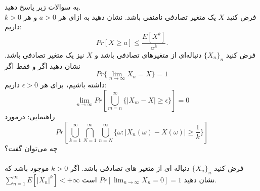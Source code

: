 \problem{}
به سوالات زیر پاسخ دهید.\\
    \subproblem{}
     فرض کنید \( X \) یک متغیر تصادفی نامنفی باشد. نشان دهید به ازای هر \( a > 0 \) و هر \( k > 0 \) داریم:
    \[
    Pr[X \geq a] \leq \frac{E[X^k]}{a^k}.
    \]
    \subproblem{}
     فرض کنید \( \{X_n\}_n \) دنباله‌ای از متغیرهای تصادفی باشد و \( X \) نیز یک متغیر تصادفی باشد. نشان دهید اگر و فقط اگر 
    \[
    Pr\{\lim_{n \to \infty} X_n = X\} = 1
    \]
    داشته باشیم، برای هر \( \epsilon > 0 \) داریم:
    \[
    \lim_{n \to \infty} Pr[\bigcup_{m=n}^\infty \{|X_m - X| \geq \epsilon\}] = 0
    \]
    راهنمایی: درمورد
    \[
    Pr[\bigcup_{k=1}^\infty \bigcap_{N=1}^\infty \bigcup_{n=N}^\infty \{\omega : |X_n(\omega) - X(\omega)| \geq \frac{1}{k}\}]
    \]
    چه می‌توان گفت؟
    \\\\
    \subproblem{}
    فرض کنید 
    $\{X_n\}_n$
    دنباله ای از متغیر های تصادفی باشد.
    اگر
    $k>0$
    موجود باشد که \\
    $\sum_{n=1}^{\infty}E[|X_n|^k] < +\infty$
    نشان دهید
    $Pr[\lim_{n \to \infty} X_n = 0] = 1$
    است.\\